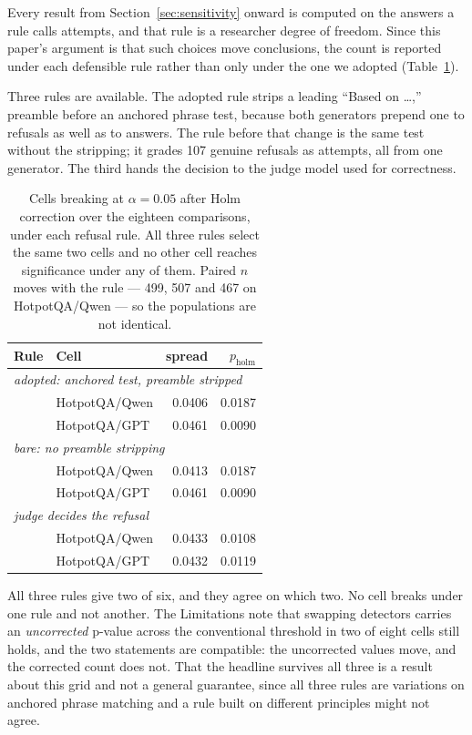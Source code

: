 \documentclass[11pt]{article}
\begin{document}
Every result from Section~\ref{sec:sensitivity} onward is computed on the answers a rule calls attempts, and that rule is a researcher degree of freedom. Since this paper's argument is that such choices move conclusions, the count is reported under each defensible rule rather than only under the one we adopted (Table~\ref{tab:refusalrule}).

Three rules are available. The adopted rule strips a leading ``Based on \ldots,'' preamble before an anchored phrase test, because both generators prepend one to refusals as well as to answers. The rule before that change is the same test without the stripping; it grades 107 genuine refusals as attempts, all from one generator. The third hands the decision to the judge model used for correctness.

\begin{table}[t]
\centering\small
\begin{tabular}{llrr}
\toprule
\textbf{Rule} & \textbf{Cell} & spread & $p_{\mathrm{holm}}$ \\
\midrule
\multicolumn{4}{l}{\emph{adopted: anchored test, preamble stripped}} \\
 & HotpotQA/Qwen & 0.0406 & 0.0187 \\
 & HotpotQA/GPT & 0.0461 & 0.0090 \\
\midrule
\multicolumn{4}{l}{\emph{bare: no preamble stripping}} \\
 & HotpotQA/Qwen & 0.0413 & 0.0187 \\
 & HotpotQA/GPT & 0.0461 & 0.0090 \\
\midrule
\multicolumn{4}{l}{\emph{judge decides the refusal}} \\
 & HotpotQA/Qwen & 0.0433 & 0.0108 \\
 & HotpotQA/GPT & 0.0432 & 0.0119 \\
\bottomrule
\end{tabular}
\caption{Cells breaking at $\alpha = 0.05$ after Holm correction over the eighteen comparisons, under each refusal rule. All three rules select the same two cells and no other cell reaches significance under any of them. Paired $n$ moves with the rule --- 499, 507 and 467 on HotpotQA/Qwen --- so the populations are not identical.}
\label{tab:refusalrule}
\end{table}

All three rules give two of six, and they agree on which two. No cell breaks under one rule and not another. The Limitations note that swapping detectors carries an \emph{uncorrected} p-value across the conventional threshold in two of eight cells still holds, and the two statements are compatible: the uncorrected values move, and the corrected count does not. That the headline survives all three is a result about this grid and not a general guarantee, since all three rules are variations on anchored phrase matching and a rule built on different principles might not agree.
\end{document}
